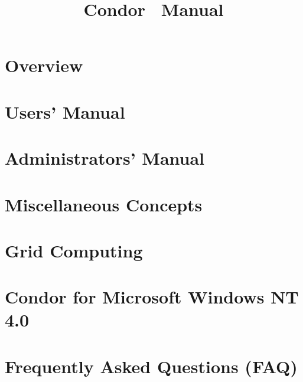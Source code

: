 \documentclass[titlepage,oneside]{book}
\begin{document}
\title{Condor\textsuperscript{\small{\textregistered}} \VersionNotice\ Manual}
\author{\AuthorNotice}
\maketitle


\tableofcontents

\sloppy
\begin{small}

\end{small}

\newpage
{}

\chapter{Overview}
\label{overview}


\chapter{Users' Manual}
\label{user-manual}


\chapter{Administrators' Manual}
\label{admin-manual}


\chapter{Miscellaneous Concepts}




\chapter{Grid Computing}
\label{grid-computing}


\chapter{Condor for Microsoft Windows NT 4.0}
\label{condor-nt}



\chapter{Frequently Asked Questions (FAQ)}
\label{sec:FAQ}

\end{document}
